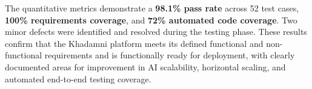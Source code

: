 The quantitative metrics demonstrate a \textbf{98.1\% pass rate} across 52 test cases, \textbf{100\% requirements coverage}, and \textbf{72\% automated code coverage}. Two minor defects were identified and resolved during the testing phase. These results confirm that the Khadamni platform meets its defined functional and non-functional requirements and is functionally ready for deployment, with clearly documented areas for improvement in AI scalability, horizontal scaling, and automated end-to-end testing coverage.
